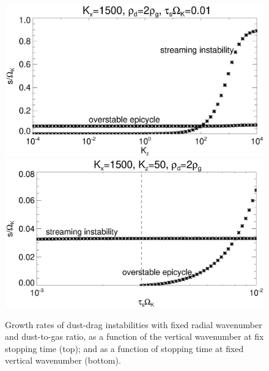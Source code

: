 \begin{figure}
  \includegraphics[width=\linewidth]{figures/streaming2}
  \includegraphics[width=\linewidth]{figures/streaming3}
  \caption{Growth rates of dust-drag instabilities with fixed radial
    wavenumber and dust-to-gas ratio, as a function of
    the vertical wavenumber at fix stopping time (top); and as a
    function of stopping time at fixed vertical wavenumber (bottom).  
\label{dusty_growth}
  }
\end{figure}


















